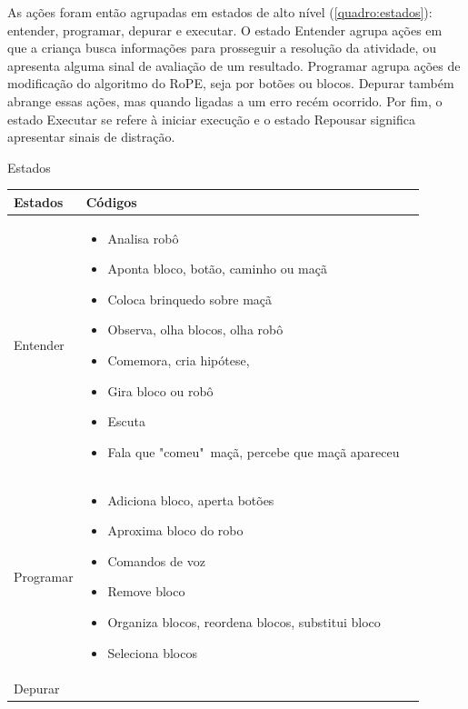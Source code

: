  As ações foram então agrupadas em estados de alto nível (\autoref{quadro:estados}): entender, programar, depurar e executar. O estado Entender agrupa ações em que a criança busca informações para prosseguir a resolução da atividade, ou apresenta alguma sinal de avaliação de um resultado. Programar agrupa ações de modificação do algoritmo do RoPE, seja por botões ou blocos. Depurar também abrange essas ações, mas quando ligadas a um erro recém ocorrido. Por fim, o estado Executar se refere à iniciar execução e o estado Repousar significa apresentar sinais de distração.

 \begin{quadro}[!h]
    \begin{table_env}
    \caption{Estados}
     \label{quadro:estados}
     \begin{tabular}{@{}l m{} c@{}}
        \toprule
        \textbf{Estados} & \textbf{Códigos}  \\ \midrule
        Entender & 

        \begin{itemize}
            \item Analisa robô
            \item Aponta bloco, botão, caminho ou maçã
            \item Coloca brinquedo sobre maçã
            \item Observa, olha blocos, olha robô
            \item Comemora, cria hipótese,
            \item Gira bloco ou robô
            \item Escuta
            \item Fala que "comeu"\ maçã, percebe que maçã apareceu
        \end{itemize} \\ \hline
        Programar & 

        \begin{itemize}
            \item Adiciona bloco, aperta botões
            \item Aproxima bloco do robo
            \item Comandos de voz
            \item Remove bloco
            \item Organiza blocos, reordena blocos, substitui bloco
            \item Seleciona blocos
        \end{itemize}
        \\ \hline
        Depurar & 


\end{tabular}
\end{table_env}
\end{quadro}
